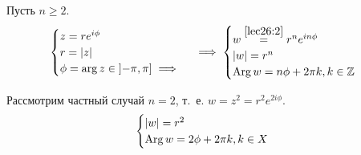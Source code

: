 \documentclass[../../main.tex]{subfiles}
\begin{document}
Пусть $n \geq 2$.
\[
\begin{cases}
 z =re^{i\phi}\\
 r = |z| \\
 \phi = \arg z \in \left] -\pi, \pi \right] \implies &
\end{cases}
\implies
\begin{cases}
 w\stackrel{\eqref{lec26:2}}{=} r^ne^{in\phi} \\
|w| = r^{n} \\
\operatorname{Arg} w = n \phi + 2\pi k, k \in \mathbb{Z}
\end{cases}
\]

Рассмотрим частный случай $n = 2$, т.~е. $w = z^2 = r^2e^{2i\phi}$.
\[
 \begin{cases}
  |w| = r^2 \\
\operatorname{Arg} w = 2\phi + 2\pi k, k \in X
 \end{cases}
\]
\end{document}
